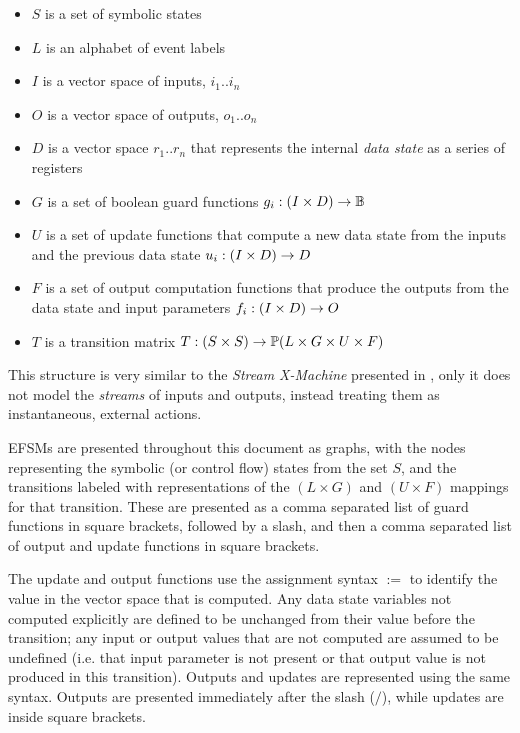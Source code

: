 \begin{itemize}
\item{$S$ is a set of symbolic states}
\item{$L$ is an alphabet of event labels}
\item{$I$ is a vector space of inputs, $i_{1} .. i_{n}$}
\item{$O$ is a vector space of outputs, $o_{1} .. o_{n}$}
\item{$D$ is a vector space $r_{1} .. r_{n}$ that represents the internal \emph{data state} as a series of registers}
\item{$G$ is a set of boolean guard functions $g_{i} : (I \times D) \rightarrow {\mathbb B}$}
\item{$U$ is a set of update functions that compute a new data state from the inputs and the previous data state $u_{i} : (I \times D) \rightarrow D$}
\item{$F$ is a set of output computation functions that produce the outputs from the data state and input parameters $f_{i} : (I \times D) \rightarrow O$}
\item{$T$ is a transition matrix $T : (S \times S) \rightarrow \mathbb P (L \times G \times U \times F)$}
\end{itemize}

This structure is very similar to the \emph{Stream X-Machine} presented in \cite{StreamXMachines}, only it does not model the \emph{streams} of inputs and outputs, instead treating them as instantaneous, external actions.

EFSMs are presented throughout this document as graphs, with the nodes representing the symbolic (or control flow) states from the set $S$, and the transitions labeled with representations of the $(L \times G)$ and $(U \times F)$ mappings for that transition. These are presented as a comma separated list of guard functions in square brackets, followed by a slash, and then a comma separated list of output and update functions in square brackets.

The update and output functions use the assignment syntax $:=$ to identify the value in the vector space that is computed. Any data state variables not computed explicitly are defined to be unchanged from their value before the transition; any input or output values that are not computed are assumed to be undefined (i.e. that input parameter is not present or that output value is not produced in this transition). Outputs and updates are represented using the same syntax. Outputs are presented immediately after the slash ($/$), while updates are inside square brackets.

